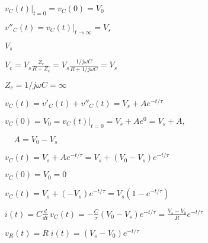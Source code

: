 \documentclass{article}
\def\lthtmlcheckvsize{\ifdim\ht\sizebox<\vsize 
  \ifdim\wd\sizebox<\hsize\expandafter\hfill\fi \expandafter\vfill
  \else\expandafter\vss\fi}%
\begin{document}
{\newpage\clearpage
{}%
$ v_C(t)\big|_{t=0}=v_C(0)=V_0$%
\lthtmlindisplaymathZ
\lthtmlcheckvsize\clearpage}

{\newpage\clearpage
{}%
$ v''_C(t)=v_C(t)|_{t\rightarrow \infty}=V_s$%
\lthtmlindisplaymathZ
\lthtmlcheckvsize\clearpage}

{\newpage\clearpage
{}%
$ V_s$%
\lthtmlindisplaymathZ
\lthtmlcheckvsize\clearpage}

{\newpage\clearpage
{}%
$\displaystyle V_c=V_s\frac{Z_c}{R+Z_c}=V_s\frac{1/j\omega C}{R+1/j\omega C}=V_s$%
\lthtmlindisplaymathZ
\lthtmlcheckvsize\clearpage}

{\newpage\clearpage
{}%
$ Z_c=1/j\omega C=\infty$%
\lthtmlindisplaymathZ
\lthtmlcheckvsize\clearpage}

{\newpage\clearpage
{}%
$\displaystyle v_C(t)=v'_C(t)+v''_C(t)=V_s+A e^{-t/\tau}$%
\lthtmlindisplaymathZ
\lthtmlcheckvsize\clearpage}

{\newpage\clearpage
{}%
$\displaystyle v_C(0)=V_0=v_C(t)\big|_{t=0}=V_s+Ae^{0}=V_s+A,
\;\;\;\;\;$%
\lthtmlindisplaymathZ
\lthtmlcheckvsize\clearpage}

{\newpage\clearpage
{}%
$\displaystyle \;\;\;\;A=V_0-V_s$%
\lthtmlindisplaymathZ
\lthtmlcheckvsize\clearpage}

{\newpage\clearpage
{}%
$\displaystyle v_C(t)=V_s+A e^{-t/\tau}=V_s+(V_0-V_s) e^{-t/\tau}$%
\lthtmlindisplaymathZ
\lthtmlcheckvsize\clearpage}

{\newpage\clearpage
{}%
$ v_C(0)=V_0=0$%
\lthtmlindisplaymathZ
\lthtmlcheckvsize\clearpage}

{\newpage\clearpage
{}%
$\displaystyle v_C(t)=V_s+(-V_s) e^{-t/\tau}=V_s(1-e^{-t/\tau})$%
\lthtmlindisplaymathZ
\lthtmlcheckvsize\clearpage}

{\newpage\clearpage
{}%
$\displaystyle i(t)=C\frac{d}{dt}\,v_C(t)=-\frac{C}{\tau}(V_0-V_s)e^{-t/\tau}
=\frac{V_s-V_0}{R}e^{-t/\tau}$%
\lthtmlindisplaymathZ
\lthtmlcheckvsize\clearpage}

{\newpage\clearpage
{}%
$\displaystyle v_R(t)=R\; i(t)=(V_s-V_0) e^{-t/\tau}$%
\lthtmlindisplaymathZ
\lthtmlcheckvsize\clearpage}
\end{document}
